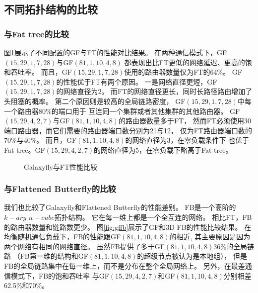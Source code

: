 \subsection{不同拓扑结构的比较}


\subsubsection{与Fat tree的比较}
图\ref{fig:gfft}展示了不同配置的GF与FT的性能对比结果。
在两种通信模式下，GF$(15,29,1,7,28)$与GF$(81,1,10,4,8)$
都表现出比FT更低的网络延迟、更高的饱和吞吐率。
而且，GF$(15,29,1,7,28)$使用的路由器数量仅为FT的64\%。
GF$(15,29,1,7,28)$的性能优于FT有两个原因。
一是网络直径更短，GF$(15,29,1,7,28)$的网络直径为2。
而FT的网络直径更长，同时长路径路由增加了头阻塞的概率。
第二个原因则是较高的全局链路密度，
GF$(15,29,1,7,28)$中每一个路由器80\%的端口用于
互连同一个集群或者其他集群的其他路由器。
GF$(15,29,4,2,7)$与GF$(81,1,10,4,8)$的路由器数量多于FT，
然而FT必须使用30端口路由器，而它们需要的路由器端口数分别为21与12，
仅为FT路由器端口数的70\%与40\%。
而且，GF$(81,1,10,4,8)$的网络直径为3，在零负载条件下
也优于Fat tree。GF$(15,29,4,2,7)$的网络直径为5，在零负载下略高于Fat tree。

\begin{figure}
  \centering
  \begin{minipage}[t]{\textwidth}
    \centering
    \caption{Galaxyfly与FT性能比较}
    \label{fig:gfft}
  \end{minipage}
\end{figure}

\subsubsection{与Flattened Butterfly的比较}
我们也比较了Galaxyfly和Flattened Butterfly的性能差别。
FB是一个高阶的$k-ary$ $n-cube$拓扑结构。
它在每一维上都是一个全互连的网络。
相比FT，FB的路由器数量和链路数更少。
图\ref{fig:gffb}展示了GF和3D FB的性能比较结果。
在均衡随机通信负载下，FB的性能跟GF$(81,1,10,4,8)$的相近,
其主要原因是因为两个网络有相同的网络直径。
虽然FB提供了多于GF$(81,1,10,4,8)$36\%的全局链路
（FB第一维的结构和GF$(81,1,10,4,8)$的超级节点被认为是本地组），
但是FB的全局链路集中在每一维上，而不是分布在整个全局网络上。
另外，在最差通信模式下，FB的饱和吞吐率
与GF$(15,29,4,2,7)$和GF$(81,1,10,4,8)$分别相差62.5\%和70\%。

